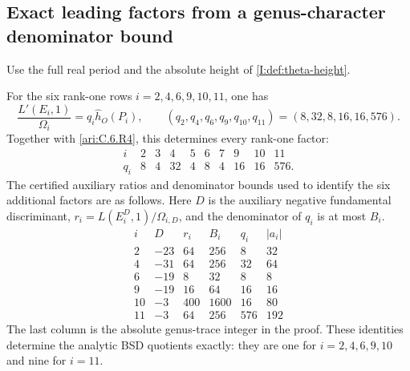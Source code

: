 \subsection{Exact leading factors from a genus-character denominator bound}

\begin{proposition}\hypertarget{tag-0014}{}\label{ari:C.6.R5}

Use the full real period and the absolute height of
\cref{I:def:theta-height}.

For the six rank-one rows $i=2,4,6,9,10,11$, one has
\[
 \frac{L'(E_i,1)}{\Omega_i}
   =q_i\widehat h_O(P_i),\qquad
 (q_2,q_4,q_6,q_9,q_{10},q_{11})=(8,32,8,16,16,576).
\]
Together with \ref{ari:C.6.R4}, this determines every rank-one factor:
\[
\begin{array}{c|rrrrrrrrr}
 i&2&3&4&5&6&7&9&10&11\\\hline
 q_i&8&4&32&4&8&4&16&16&576.
\end{array}
\]
The certified auxiliary ratios and denominator bounds used to identify
the six additional factors are as follows. Here $D$ is the auxiliary
negative fundamental discriminant,
$r_i=L(E_i^D,1)/\Omega_{i,D}$, and the denominator of $q_i$ is at most
$B_i$.
\[
\begin{array}{c|r|r|r|r|r}
 i&D&r_i&B_i&q_i&|a_i|\\\hline
 2&-23&64&256&8&32\\
 4&-31&64&256&32&64\\
 6&-19&8&32&8&8\\
 9&-19&16&64&16&16\\
 10&-3&400&1600&16&80\\
 11&-3&64&256&576&192
\end{array}
\]
The last column is the absolute genus-trace integer in the proof. These
identities determine the analytic BSD quotients exactly: they are one
for $i=2,4,6,9,10$ and nine for $i=11$.
\end{proposition}



